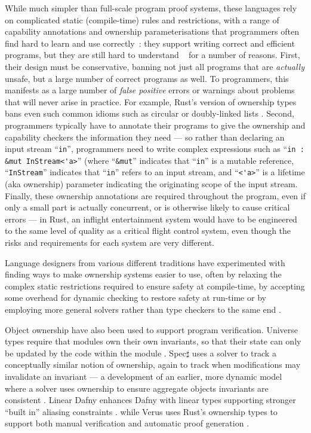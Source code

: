 While much simpler than full-scale program proof systems, these 
languages rely on complicated static (compile-time) rules and
restrictions, with a range of capability annotations and ownership
parameterisations that  programmers often find hard to learn and use
correctly~\cite{LearnRust,VizRust,HardRust}: they support writing
 correct and efficient programs, but they are still hard to understand
~\cite{SafeRust,FightRust} for a number of
reasons. First, their design must be conservative, banning not just
all  programs that are \textit{actually} unsafe, but a large
number of correct programs as well.  To programmers, this
manifests as a large number of \textit{false positive} errors or
warnings about problems that will never arise in practice.  For
example, Rust's version of ownership types~\cite{RustBook} bans even
such common idioms such as circular or doubly-linked lists
\cite{rusty-ftfjp2022,RustDLL1,RustDLL2,RustDLL3,RustDLL4}.
%
Second,
programmers typically have to annotate their programs to give the
ownership and capability checkers the information they need --- so
rather than declaring an input stream ``\verb+in+'', programmers need
to write complex expressions such as ``\verb+in : &mut InStream<'a>+''
(where ``\verb+&mut+'' indicates that ``\verb+in+'' is a mutable
reference, ``\verb+InStream+'' indicates that ``\verb+in+'' refers to
an input stream, and  ``\verb+<'a>+'' is a lifetime (aka ownership)
parameter indicating the originating scope of the input stream.
Finally, these ownership annotations are required throughout
the program,  even if only a small part is actually concurrent, or is
otherwise likely to cause critical errors --- in Rust, an inflight
entertainment system would have to be engineered to the same level of
quality as a critical flight control system, even though the risks and
requirements for each system are very different.

Language designers from various different traditions
have experimented with finding ways to make ownership systems easier
to use, often by relaxing the complex static restrictions required to
ensure safety at compile-time, by accepting some overhead for dynamic
checking to restore safety at run-time
\cite{dafnydala-ftfjp2024,reggio-oopsla2023,gallifrey-pldi2022}
or by employing more general solvers rather than type checkers to the
same end \cite{Astrauskas2019,prusti}.


Object ownership have also been used to support program
verification. Universe types require that modules own their own
invariants, so that their state can only be updated by the code within
the module
\cite{pubsdoc:universe-types-encapsulation,DietlMueller05,MuellerPoetzsch-HeffterLeavens06}.
Spec$\sharp$ uses a solver to track a conceptually similar notion of
ownership, again to track when modifications may invalidate an
invariant --- a development of an earlier, more dynamic model where
a solver uses ownership to ensure aggregate objects invariants are
consistent \cite{verification-oo-invariants-jot2004}.
Linear Dafny enhances Dafny with linear types
supporting stronger ``built in'' aliasing constraints
\cite{linear-dafny-oopsla2022}.
while Verus uses Rust's ownership types to support both manual
verification and automatic proof generation
\cite{verus-oopsla2023,autoverus-arXiv2024}.


